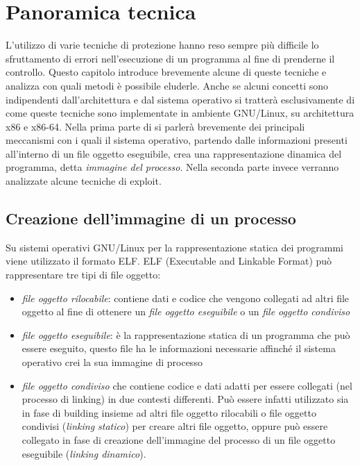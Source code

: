 \chapter{Panoramica tecnica}

L'utilizzo di varie tecniche di protezione hanno reso sempre più
difficile lo sfruttamento di errori nell'esecuzione di un programma al
fine di prenderne il controllo. Questo capitolo introduce brevemente
alcune di queste tecniche e analizza con quali metodi è possibile
eluderle. Anche se alcuni concetti sono indipendenti dall'architettura
e dal sistema operativo si tratterà esclusivamente di come queste
tecniche sono implementate in ambiente GNU/Linux, su architettura x86
e x86-64. Nella prima parte di si parlerà brevemente dei principali
meccanismi con i quali il sistema operativo, partendo dalle
informazioni presenti all'interno di un file oggetto eseguibile, crea
una rappresentazione dinamica del programma, detta \emph{immagine del
  processo}. Nella seconda parte invece verranno analizzate alcune
tecniche di exploit.

\section{Creazione dell'immagine di un processo}

Su sistemi operativi GNU/Linux per la rappresentazione statica dei
programmi viene utilizzato il formato ELF.  ELF (Executable and
Linkable Format) può rappresentare tre tipi di file oggetto:

\begin{itemize}
  \item \emph{file oggetto rilocabile}: contiene dati e codice che
    vengono collegati ad altri file oggetto al fine di ottenere un
    \emph{file oggetto eseguibile} o un \emph{file oggetto condiviso}

  \item \emph{file oggetto eseguibile}: è la rappresentazione statica
    di un programma che può essere eseguito, questo file ha le
    informazioni necessarie affinché il sistema operativo crei la sua
    immagine di processo

  \item \emph{file oggetto condiviso} che contiene codice e dati
    adatti per essere collegati (nel processo di linking) in due
    contesti differenti. Può essere infatti utilizzato sia in fase di
    building insieme ad altri file oggetto rilocabili o file oggetto
    condivisi (\emph{linking statico}) per creare altri file oggetto,
    oppure può essere collegato in fase di creazione dell'immagine del
    processo di un file oggetto eseguibile (\emph{linking dinamico}).

\end{itemize}

